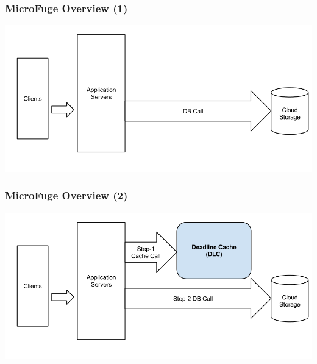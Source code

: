 \documentclass{beamer}
\begin{document}

\begin{frame}
  \frametitle{MicroFuge Overview (1)}
  \begin{center}
  \includegraphics[scale=0.32]{img/MF_FULL_NEW_1.png}
  \end{center}
\end{frame}

\begin{frame}
  \frametitle{MicroFuge Overview (2)}
  \begin{center}
  \includegraphics[scale=0.32]{img/MF_FULL_NEW_2.png}
  \end{center}
\end{frame}
\end{document}
